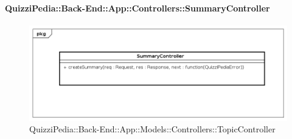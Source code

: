 \paragraph{QuizziPedia::Back-End::App::Controllers::SummaryController}
\label{QuizziPedia::Back-End::App::Controllers::SummaryController}
\begin{figure}
	\centering
	\includegraphics[scale=0.45]{UML/Package/QuizziPedia_Back-End_App_Controllers_SummaryController.png}
	\caption{QuizziPedia::Back-End::App::Models::Controllers::TopicController}
\end{figure}

